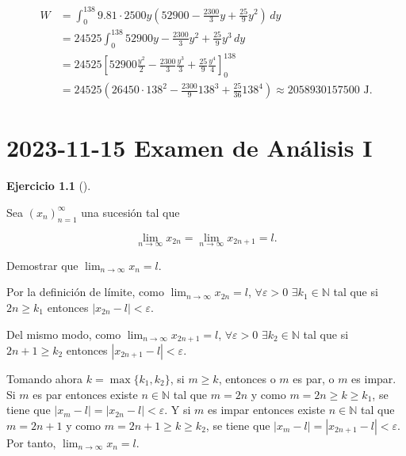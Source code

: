 \documentclass[
  spanish,
  a4paper,
]{scrreport}
\theoremstyle{definition}
\newtheorem{exercise}{Ejercicio}[chapter]
\theoremstyle{remark}
\begin{document}
\begin{tcolorbox}
\begin{align*}
W 
&= \int_0^{138} 9.81\cdot 2500 y \left(52900 -\frac{2300}{3}y +\frac{25}{9}y^2\right)\,dy \\
&= 24525 \int_0^{138} 52900y -\frac{2300}{3}y^2 +\frac{25}{9}y^3\,dy \\
&= 24525 \left[52900\frac{y^2}{2} -\frac{2300}{3}\frac{y^3}{3} +\frac{25}{9}\frac{y^4}{4}\right]_0^{138} \\
&= 24525\left(26450 \cdot 138^2 - \frac{2300}{9} 138^3 + \frac{25}{36} 138^4\right) 
\approx 2058930157500 \mbox{ J}.
\end{align*}

\end{tcolorbox}


\chapter{\texorpdfstring{2023-11-15 Examen de Análisis
I}{2023-11-15  Examen de Análisis I}}\label{examen-de-anuxe1lisis-i-2}

\begin{exercise}[]\protect\hypertarget{exr-1}{}\label{exr-1}

Sea \((x_n)_{n=1}^\infty\) una sucesión tal que

\[
\lim_{n\to\infty} x_{2n}= \lim_{n\to\infty}x_{2n+1}=l.
\]

Demostrar que \(\lim_{n\to\infty}x_n = l\).

\end{exercise}

\begin{tcolorbox}[enhanced jigsaw, arc=.35mm, bottomrule=.15mm, bottomtitle=1mm, breakable, colback=white, colbacktitle=quarto-callout-tip-color!10!white, colframe=quarto-callout-tip-color-frame, coltitle=black, left=2mm, leftrule=.75mm, opacityback=0, opacitybacktitle=0.6, rightrule=.15mm, title=\textcolor{quarto-callout-tip-color}{\faLightbulb}\hspace{0.5em}{Solución}, titlerule=0mm, toprule=.15mm, toptitle=1mm]

Por la definición de límite, como \(\lim_{n\to\infty} x_{2n}= l\),
\(\forall \varepsilon>0\) \(\exists k_1\in\mathbb{N}\) tal que si
\(2n\geq k_1\) entonces \(|x_{2n}-l|<\varepsilon\).

Del mismo modo, como \(\lim_{n\to\infty} x_{2n+1}= l\),
\(\forall \varepsilon>0\) \(\exists k_2\in\mathbb{N}\) tal que si
\(2n+1\geq k_2\) entonces \(|x_{2n+1}-l|<\varepsilon\).

Tomando ahora \(k=\max\{k_1,k_2\}\), si \(m\geq k\), entonces o \(m\) es
par, o \(m\) es impar. Si \(m\) es par entonces existe
\(n\in\mathbb{N}\) tal que \(m=2n\) y como \(m=2n\geq k\geq k_1\), se
tiene que \(|x_m-l|=|x_{2n}-l|<\varepsilon\). Y si \(m\) es impar
entonces existe \(n\in\mathbb{N}\) tal que \(m=2n+1\) y como
\(m=2n+1\geq k\geq k_2\), se tiene que
\(|x_m-l|=|x_{2n+1}-l|<\varepsilon\). Por tanto,
\(\lim_{n\to\infty}x_n = l\).

\end{tcolorbox}
\end{document}
